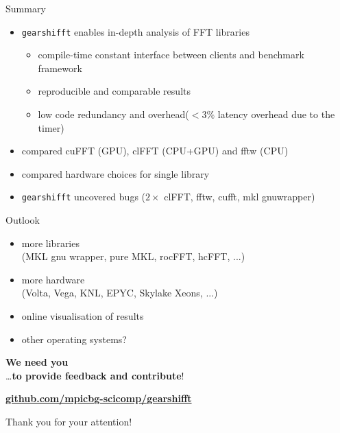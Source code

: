 \documentclass[t,11pt,hyperref={
  pdftitle = {gearshifft},
  pdfsubject = {gearshifft},
  pdfborder={0 0 0},
  colorlinks=true,
  urlcolor=red,
  citecolor=red,
  linkcolor=red,
  pdfauthor={Peter Steinbach, Matthias Werner}
  }
]{beamer}
\newcommand{\gearshifft}{\texttt{gearshifft}}
\begin{document}
\begin{frame}{Summary}{}

\vfill  
  \begin{itemize}
  \item \gearshifft{} enables in-depth analysis of FFT libraries
    \begin{itemize}
    \item compile-time constant interface between clients and benchmark framework
    \item reproducible and comparable results
    \item low code redundancy and overhead\newline ($<3\%$ latency overhead due to the timer)
    \end{itemize}
\pause
\vfill
  \item compared cuFFT (GPU), clFFT (CPU+GPU) and fftw (CPU)
  \item compared hardware choices for single library
  \item \gearshifft{} uncovered bugs ($2\times$ clFFT, fftw, cufft, mkl gnuwrapper)
  \end{itemize}
\vfill
\end{frame}

\begin{frame}{Outlook}{}

\vfill
  \begin{itemize}
  \item more libraries\\
    (MKL gnu wrapper, pure MKL, rocFFT, hcFFT, ...)
  \item more hardware \\
    (Volta, Vega, KNL, EPYC, Skylake Xeons, ...)
  \item online visualisation of results
  \item other operating systems?
  \end{itemize}

\vfill
  \pause \Large
  \textbf{We need you}\\
  \quad\quad \ldots \textbf{to provide feedback and contribute}!\\

\vfill

\begin{center}
  \href{https://github.com/mpicbg-scicomp/gearshifft}{\textbf{github.com/mpicbg-scicomp/gearshifft}}
\end{center}


\vfill
  \pause
 \centering
  Thank you for your attention!
\vfill
\end{frame}
\end{document}
